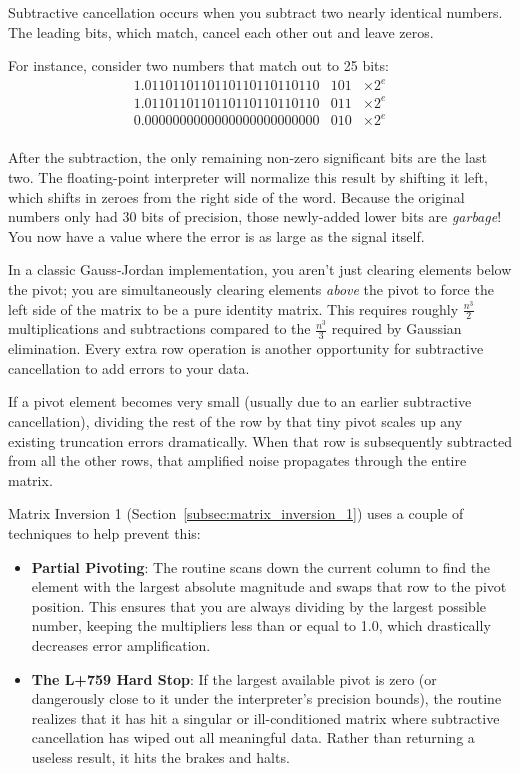 Subtractive cancellation occurs when you subtract two nearly identical numbers. The leading bits, which match, cancel each other out and leave zeros.

For instance, consider two numbers that match out to 25 bits:
$$\begin{array}{rcc}
1.0110110110110110110110110 & 101 & \times 2^e \\

1.0110110110110110110110110 & 011 & \times 2^e \\
\hline
0.0000000000000000000000000 & 010 & \times 2^e \\
\end{array}$$

After the subtraction, the only remaining non-zero significant bits are the last two. The floating-point interpreter will normalize this result by shifting it left, which shifts in zeroes from the right side of the word. Because the original numbers only had 30 bits of precision, those newly-added lower bits are \emph{garbage}! You now have a value where the error is as large as the signal itself.

In a classic Gauss-Jordan implementation, you aren't just clearing elements below the pivot; you are simultaneously clearing elements \emph{above} the pivot to force the left side of the matrix to be a pure identity matrix. This requires roughly $\frac{n^3}{2}$ multiplications and subtractions compared to the $\frac{n^3}{3}$ required by Gaussian elimination. Every extra row operation is another opportunity for subtractive cancellation to add errors to your data.

If a pivot element becomes very small (usually due to an earlier subtractive cancellation), dividing the rest of the row by that tiny pivot scales up any existing truncation errors dramatically. When that row is subsequently subtracted from all the other rows, that amplified noise propagates through the entire matrix.

Matrix Inversion 1 (Section~\ref{subsec:matrix_inversion_1}) uses a couple of techniques to help prevent this:
\begin{itemize}
	
\item \textbf{Partial Pivoting}: The routine scans down the current column to find the element with the largest absolute magnitude and swaps that row to the pivot position. This ensures that you are always dividing by the largest possible number, keeping the multipliers less than or equal to 1.0, which drastically decreases error amplification.

\item \textbf{The L+759 Hard Stop}: If the largest available pivot is zero (or dangerously close to it under the interpreter's precision bounds), the routine realizes that it has hit a singular or ill-conditioned matrix where subtractive cancellation has wiped out all meaningful data. Rather than returning a useless result, it hits the brakes and halts.
\end{itemize}
\newpage

